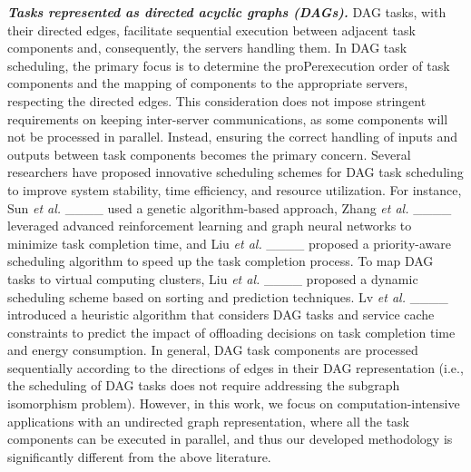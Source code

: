 \noindent
\textit{\textbf{Tasks represented as directed acyclic graphs (DAGs). }}{DAG tasks, with their directed edges, facilitate sequential execution between adjacent task components and, consequently, the servers handling them. In DAG task scheduling, the primary focus is to determine the proPerexecution order of task components and the mapping of components to the appropriate servers, respecting the directed edges. This consideration does not impose stringent requirements on keeping inter-server communications, as some components will not be processed in parallel. Instead, ensuring the correct handling of inputs and outputs between task components becomes the primary concern.} Several researchers have proposed innovative scheduling schemes for DAG task scheduling to improve system stability, time efficiency, and resource utilization. For instance, Sun \textit{et al.} ____ used a genetic algorithm-based approach, Zhang \textit{et al.} ____ leveraged advanced reinforcement learning and graph neural networks to minimize task completion time, and Liu \textit{et al.} ____ proposed a priority-aware scheduling algorithm to speed up the task completion process. To map DAG tasks to virtual computing clusters, Liu \textit{et al.} ____ proposed a dynamic scheduling scheme based on sorting and prediction techniques. Lv \textit{et al.} ____ introduced a heuristic algorithm that considers DAG tasks and service cache constraints to predict the impact of offloading decisions on task completion time and energy consumption. In general, DAG task components are processed sequentially according to the directions of edges in their DAG representation (i.e., the scheduling of DAG tasks does not require addressing the subgraph isomorphism problem). However, in this work, we focus on computation-intensive applications with an undirected graph representation, where all the task components can be executed in parallel, and thus our developed methodology is significantly different from the above literature. 
	
